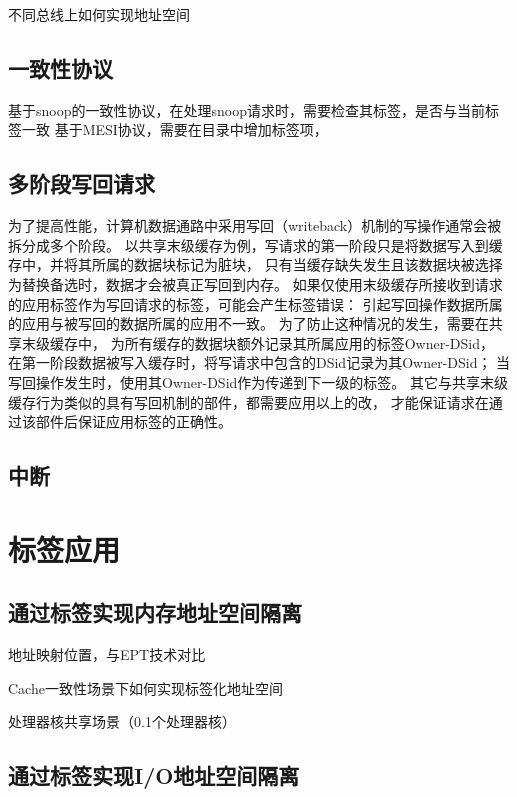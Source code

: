 不同总线上如何实现地址空间

\subsection{一致性协议}

基于snoop的一致性协议，在处理snoop请求时，需要检查其标签，是否与当前标签一致
基于MESI协议，需要在目录中增加标签项，

\subsection{多阶段写回请求}

为了提高性能，计算机数据通路中采用写回（writeback）机制的写操作通常会被拆分成多个阶段。
以共享末级缓存为例，写请求的第一阶段只是将数据写入到缓存中，并将其所属的数据块标记为脏块，
只有当缓存缺失发生且该数据块被选择为替换备选时，数据才会被真正写回到内存。
如果仅使用末级缓存所接收到请求的应用标签作为写回请求的标签，可能会产生标签错误：
引起写回操作数据所属的应用与被写回的数据所属的应用不一致。
为了防止这种情况的发生，需要在共享末级缓存中，
为所有缓存的数据块额外记录其所属应用的标签Owner-DSid，
在第一阶段数据被写入缓存时，将写请求中包含的DSid记录为其Owner-DSid；
当写回操作发生时，使用其Owner-DSid作为传递到下一级的标签。
其它与共享末级缓存行为类似的具有写回机制的部件，都需要应用以上的改，
才能保证请求在通过该部件后保证应用标签的正确性。

\subsection{中断}


\section{标签应用}

\subsection{通过标签实现内存地址空间隔离}

地址映射位置，与EPT技术对比

Cache一致性场景下如何实现标签化地址空间

处理器核共享场景（0.1个处理器核）

\subsection{通过标签实现I/O地址空间隔离}

